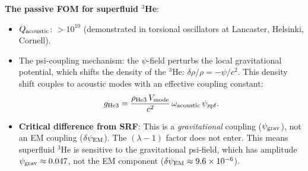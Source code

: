 \documentclass[11pt]{article}
\theoremstyle{definition}
\theoremstyle{remark}
\newcommand{\ee}[1]{\times 10^{#1}}
\newcommand{\psigrav}{\psi_{\rm grav}}
\newcommand{\psiEM}{\delta\psi_{\rm EM}}
\begin{document}
\textbf{The passive FOM for superfluid $^3$He}:
\begin{itemize}[nosep]
  \item $Q_{\rm acoustic}$: $>10^{10}$ (demonstrated in torsional
    oscillators at Lancaster, Helsinki, Cornell).
  \item The psi-coupling mechanism: the $\psi$-field perturbs the local
    gravitational potential, which shifts the density of the $^3$He:
    $\delta\rho/\rho = -\psi/c^2$. This density shift couples to
    acoustic modes with an effective coupling constant:
    \begin{equation}
      g_{\rm He3} = \frac{\rho_{\rm He3}\,V_{\rm mode}}{c^2}
      \,\omega_{\rm acoustic}\,\psi_{\rm zpf}.
    \end{equation}
  \item \textbf{Critical difference from SRF}: This is a
    \emph{gravitational} coupling ($\psigrav$), not an EM coupling
    ($\psiEM$). The $(\lambda-1)$ factor does not enter. This means
    superfluid $^3$He is sensitive to the gravitational psi-field, which
    has amplitude $\psigrav \approx 0.047$, not the EM component
    ($\psiEM \approx 9.6\ee{-6}$).
\end{itemize}
\end{document}
